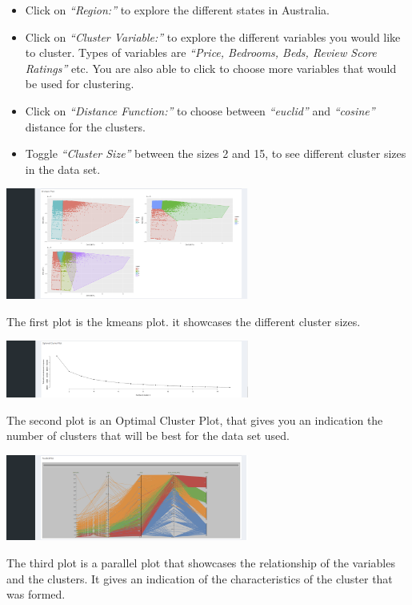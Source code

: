\documentclass[
]{article}
\providecommand{\tightlist}{%
  \setlength{\itemsep}{0pt}\setlength{\parskip}{0pt}}
\begin{document}
\begin{itemize}
\tightlist
\item
  Click on \emph{``Region:''} to explore the different states in
  Australia.
\item
  Click on \emph{``Cluster Variable:''} to explore the different
  variables you would like to cluster. Types of variables are
  \emph{``Price, Bedrooms, Beds, Review Score Ratings''} etc. You are
  also able to click to choose more variables that would be used for
  clustering.
\item
  Click on \emph{``Distance Function:''} to choose between
  \emph{``euclid''} and \emph{``cosine''} distance for the clusters.
\item
  Toggle \emph{``Cluster Size''} between the sizes 2 and 15, to see
  different cluster sizes in the data set.
\end{itemize}

\includegraphics[width=0.6\textwidth,height=\textheight]{images/cluster2.png}

The first plot is the kmeans plot. it showcases the different cluster
sizes.

\includegraphics[width=0.6\textwidth,height=\textheight]{images/cluster3.png}

The second plot is an Optimal Cluster Plot, that gives you an indication
the number of clusters that will be best for the data set used.

\includegraphics[width=0.6\textwidth,height=\textheight]{images/cluster4.png}

The third plot is a parallel plot that showcases the relationship of the
variables and the clusters. It gives an indication of the
characteristics of the cluster that was formed.
\end{document}
